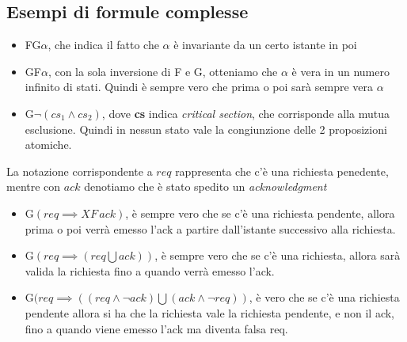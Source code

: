 \subsection{Esempi di formule complesse}
\begin{itemize}
    \item FG$\alpha$, che indica il fatto che $\alpha$ è invariante da un certo istante in poi
    \item GF$\alpha$, con la sola inversione di F e G, otteniamo che $\alpha$ è vera in un numero infinito di stati. Quindi è sempre vero che prima o poi sarà sempre vera $\alpha$
    \item G$\neg(cs_1 \land cs_2)$, dove \textbf{cs} indica \textit{critical section}, che corrisponde alla mutua esclusione. Quindi in nessun stato vale la congiunzione delle 2 proposizioni atomiche.
\end{itemize}
La notazione corrispondente a $req$ rappresenta che c'è una richiesta penedente, mentre con $ack$ denotiamo che è stato spedito un \textit{acknowledgment}
\begin{itemize}
    \item G$(req \implies XF\,ack)$, è sempre vero che se c'è una richiesta pendente, allora prima o poi verrà emesso l'ack a partire dall'istante successivo alla richiesta.
    \item G$(req \implies (req \bigcup ack))$, è sempre vero che se c'è una richiesta, allora sarà valida la richiesta fino a quando verrà emesso l'ack.
    \item G$(req \implies ((req \land \neg ack) \bigcup (ack \land \neg req) )$, è vero che se c'è una richiesta pendente allora si ha che la richiesta vale la richiesta pendente, e non il ack, fino a quando viene emesso l'ack ma diventa falsa req.
\end{itemize}
